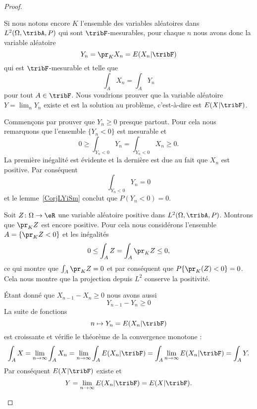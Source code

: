 \begin{proof}
\begin{subproof}
		Si nous notons encore \( K\) l'ensemble des variables aléatoires dans \( L^2(\Omega,\tribA,P)\) qui sont \( \tribF\)-mesurables, pour chaque \( n\) nous avons donc la variable aléatoire
		\begin{equation}
			Y_n=\pr_KX_n=E(X_n|\tribF)
		\end{equation}
		qui est \( \tribF\)-mesurable et telle que
		\begin{equation}
			\int_A X_n=\int_AY_n
		\end{equation}
		pour tout \( A\in\tribF\). Nous voudrions prouver que la variable aléatoire \( Y=\lim_nY_n\) existe et est la solution au problème, c'est-à-dire est \( E(X|\tribF)\).

		Commençons par prouver que \( Y_n\geq 0\) presque partout. Pour cela nous remarquons que l'ensemble \( \{ Y_n<0 \}\) est mesurable et
		\begin{equation}
			0\geq\int_{Y_n<0}Y_n=\int_{Y_n<0}X_n\geq 0.
		\end{equation}
		La première inégalité est évidente et la dernière est due au fait que \( X_n\) est positive. Par conséquent
		\begin{equation}
			\int_{Y_n<0}Y_n=0
		\end{equation}
		et le lemme~\ref{CorjLYiSm} conclut que \( P(Y_n<0)=0\).

		Soit \( Z\colon \Omega\to \eR\) une variable aléatoire positive dans \( L^2(\Omega,\tribA,P)\). Montrons que \( \pr_KZ\) est encore positive. Pour cela nous considérons l'ensemble \( A=\{ \pr_KZ<0 \}\) et les inégalités
		\begin{equation}
			0\leq \int_AZ=\int_A\pr_KZ\leq 0,
		\end{equation}
		ce qui montre que \( \int_A\pr_KZ=0\) et par conséquent que \( P\{ \pr_K(Z)<0 \}=0\). Cela nous montre que la projection depuis \( L^2\) conserve la positivité.

		Étant donné que \( X_{n-1}-X_n\geq 0\) nous avons aussi
		\begin{equation}
			Y_{n-1}-Y_{n}\geq 0
		\end{equation}
		La suite de fonctions
		\begin{equation}
			n\mapsto Y_n=E(X_n|\tribF)
		\end{equation}
		est croissante et vérifie le théorème de la convergence monotone :
		\begin{equation}
			\int_A X=\lim_{n\to \infty} \int_A X_n =\lim_{n\to \infty} \int_A E(X_n|\tribF)=\int_A\lim_{n\to \infty } E(X_n|\tribF)=\int_A Y.
		\end{equation}
		Par conséquent \( E(X|\tribF)\) existe et
		\begin{equation}
			Y=\lim_{n\to \infty} E(X_n|\tribF)=E(X|\tribF).
		\end{equation}
	\end{subproof}
\end{proof}

